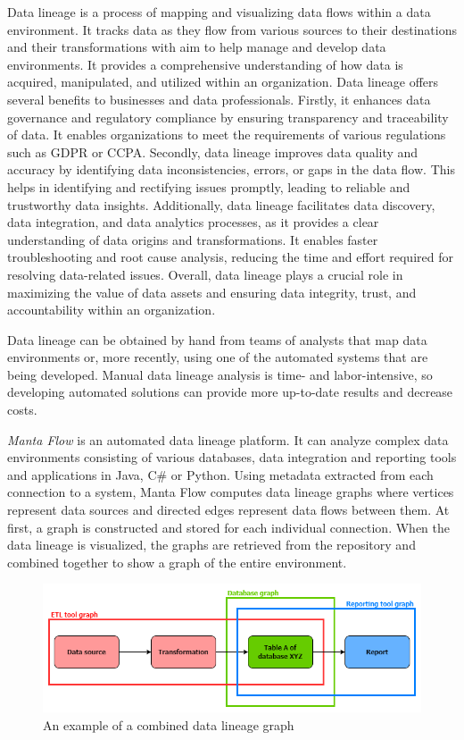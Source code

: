 Data lineage is a process of mapping and visualizing data flows within a data environment. It tracks data as they flow from various sources to their destinations and their transformations with aim to help manage and develop data environments. It provides a comprehensive understanding of how data is acquired, manipulated, and utilized within an organization. Data lineage offers several benefits to businesses and data professionals. Firstly, it enhances data governance and regulatory compliance by ensuring transparency and traceability of data. It enables organizations to meet the requirements of various regulations such as GDPR or CCPA. Secondly, data lineage improves data quality and accuracy by identifying data inconsistencies, errors, or gaps in the data flow. This helps in identifying and rectifying issues promptly, leading to reliable and trustworthy data insights. Additionally, data lineage facilitates data discovery, data integration, and data analytics processes, as it provides a clear understanding of data origins and transformations. It enables faster troubleshooting and root cause analysis, reducing the time and effort required for resolving data-related issues. Overall, data lineage plays a crucial role in maximizing the value of data assets and ensuring data integrity, trust, and accountability within an organization.
\par
Data lineage can be obtained by hand from teams of analysts that map data environments or, more recently, using one of the automated systems that are being developed. Manual data lineage analysis is time- and labor-intensive, so developing automated solutions can provide more up-to-date results and decrease costs.
\par
\textit{Manta Flow} is an automated data lineage platform. It can analyze complex data environments consisting of various databases, data integration and reporting tools and applications in Java, C\# or Python. Using metadata extracted from each connection to a system, Manta Flow computes data lineage graphs where vertices represent data sources and directed edges represent data flows between them. At first, a graph is constructed and stored for each individual connection. When the data lineage is visualized, the graphs are retrieved from the repository and combined together to show a graph of the entire environment.

\begin{figure}[ht]\centering
\includegraphics[width=1.0\textwidth]{img/graph_example.png}
\caption{An example of a combined data lineage graph}
\label{figGraphExample}
\end{figure}  

